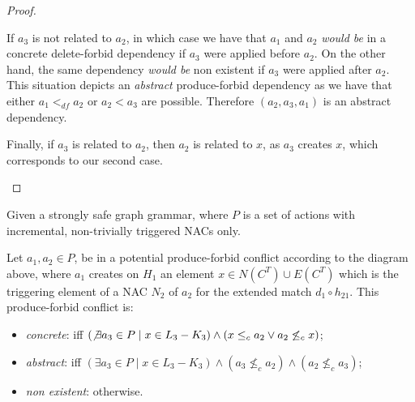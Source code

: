 \begin{proof}
\begin{description}[style=nextline,leftmargin=*]
    If $a_3$ is not related to $a_2$, in which case we have that $a_1$ and $a_2$ \emph{would be} in a concrete delete-forbid dependency if $a_3$ were applied before $a_2$. On the other hand, the same dependency \emph{would be} non existent if $a_3$ were applied after $a_2$. This situation depicts an \emph{abstract} produce-forbid dependency as we have that either $a_1 <_{df} a_2$ or $a_2 < a_3$ are possible. Therefore $(a_2,a_3,a_1)$ is an abstract dependency.

  Finally, if $a_3$ is related to $a_2$, then $a_2$ is related to $x$, as $a_3$ creates $x$, which corresponds to our second case.
\end{description}
\end{proof}

\begin{definition}\label{def:produce-forbid-strong} Given \doublyTypedGraphGrammarCore{} a strongly safe graph grammar, where $P$ is a set of actions with incremental, non-trivially triggered NACs only.

\hfill

  Let $a_1,a_2 \in P$, be in a potential produce-forbid conflict according to the diagram above, where $a_1$ creates on $H_1$ an element $x \in N(C^T) \cup E(C^T)$ which is the triggering element of a NAC $N_2$ of $a_2$ for the extended match $d_1 \circ h_{21}$. This produce-forbid conflict is:

\begin{itemize}
  \item \emph{concrete}: iff $(\not\exists a_3 \in P \mid x \in L_3 - K_3) \land (x \leq_c a_2 \lor a_2 \not\leq_c x)$; %
  \item \emph{abstract}: iff $(\exists a_3 \in P \mid x \in L_3 - K_3) \land (a_3 \not\leq_c a_2) \land (a_2 \not\leq_c a_3)$;
  \item \emph{non existent}: otherwise.
\end{itemize}

\end{definition}

